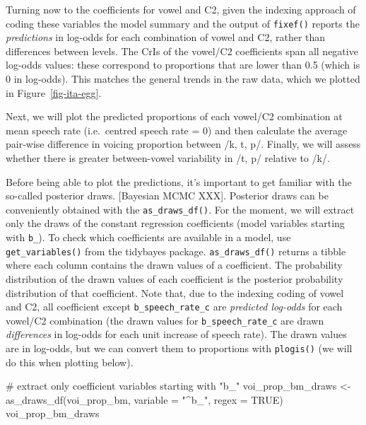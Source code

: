 \documentclass[
  authoryear,
  preprint,
  3p]{elsarticle}
\newenvironment{Shaded}{\begin{snugshade}}{\end{snugshade}}
\newcommand{\AttributeTok}[1]{\textcolor[rgb]{0.40,0.45,0.13}{#1}}
\newcommand{\CommentTok}[1]{\textcolor[rgb]{0.37,0.37,0.37}{#1}}
\newcommand{\ConstantTok}[1]{\textcolor[rgb]{0.56,0.35,0.01}{#1}}
\newcommand{\FunctionTok}[1]{\textcolor[rgb]{0.28,0.35,0.67}{#1}}
\newcommand{\NormalTok}[1]{\textcolor[rgb]{0.00,0.23,0.31}{#1}}
\newcommand{\OtherTok}[1]{\textcolor[rgb]{0.00,0.23,0.31}{#1}}
\newcommand{\StringTok}[1]{\textcolor[rgb]{0.13,0.47,0.30}{#1}}
\begin{document}
Turning now to the coefficients for vowel and C2, given the indexing
approach of coding these variables the model summary and the output of
\texttt{fixef()} reports the \emph{predictions} in log-odds for each
combination of vowel and C2, rather than differences between levels. The
CrIs of the vowel/C2 coefficients span all negative log-odds values:
these correspond to proportions that are lower than 0.5 (which is 0 in
log-odds). This matches the general trends in the raw data, which we
plotted in Figure~\ref{fig-ita-egg}.

Next, we will plot the predicted proportions of each vowel/C2
combination at mean speech rate (i.e.~centred speech rate = 0) and then
calculate the average pair-wise difference in voicing proportion between
/k, t, p/. Finally, we will assess whether there is greater
between-vowel variability in /t, p/ relative to /k/.

Before being able to plot the predictions, it's important to get
familiar with the so-called posterior draws. {[}Bayesian MCMC XXX{]}.
Posterior draws can be conveniently obtained with the
\texttt{as\_draws\_df()}. For the moment, we will extract only the draws
of the constant regression coefficients (model variables starting with
\texttt{b\_}). To check which coefficients are available in a model, use
\texttt{get\_variables()} from the tidybayes package.
\texttt{as\_draws\_df()} returns a tibble where each column contains the
drawn values of a coefficient. The probability distribution of the drawn
values of each coefficient is the posterior probability distribution of
that coefficient. Note that, due to the indexing coding of vowel and C2,
all coefficient except \texttt{b\_speech\_rate\_c} are \emph{predicted
log-odds} for each vowel/C2 combination (the drawn values for
\texttt{b\_speech\_rate\_c} are drawn \emph{differences} in log-odds for
each unit increase of speech rate). The drawn values are in log-odds,
but we can convert them to proportions with \texttt{plogis()} (we will
do this when plotting below).

\begin{Shaded}
\begin{Highlighting}[]
\CommentTok{\# extract only coefficient variables starting with "b\_"}
\NormalTok{voi\_prop\_bm\_draws }\OtherTok{\textless{}{-}} \FunctionTok{as\_draws\_df}\NormalTok{(voi\_prop\_bm, }\AttributeTok{variable =} \StringTok{"\^{}b\_"}\NormalTok{, }\AttributeTok{regex =} \ConstantTok{TRUE}\NormalTok{)}
\NormalTok{voi\_prop\_bm\_draws}
\end{Highlighting}
\end{Shaded}
\end{document}
